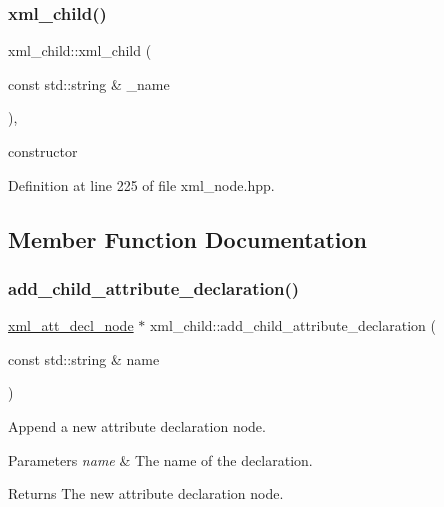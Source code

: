 \subsubsection{\texorpdfstring{xml\+\_\+child()}{xml\_child()}}
{\footnotesize\ttfamily xml\+\_\+child\+::xml\+\_\+child (\begin{DoxyParamCaption}\item[{const std\+::string \&}]{\+\_\+name }\end{DoxyParamCaption})\hspace{0.3cm}{\ttfamily [inline]}, {\ttfamily [explicit]}}



constructor 



Definition at line 225 of file xml\+\_\+node.\+hpp.



\subsection{Member Function Documentation}
\mbox{\label{classxml__child_abb4569a8a579461161027961c33dc882}} 
\subsubsection{\texorpdfstring{add\+\_\+child\+\_\+attribute\+\_\+declaration()}{add\_child\_attribute\_declaration()}}
{\footnotesize\ttfamily \hyperlink{structxml__att__decl__node}{xml\+\_\+att\+\_\+decl\+\_\+node} $\ast$ xml\+\_\+child\+::add\+\_\+child\+\_\+attribute\+\_\+declaration (\begin{DoxyParamCaption}\item[{const std\+::string \&}]{name }\end{DoxyParamCaption})}



Append a new attribute declaration node. 


\begin{DoxyParams}{Parameters}
{\em name} & The name of the declaration. \\
\hline
\end{DoxyParams}
\begin{DoxyReturn}{Returns}
The new attribute declaration node. 
\end{DoxyReturn}


